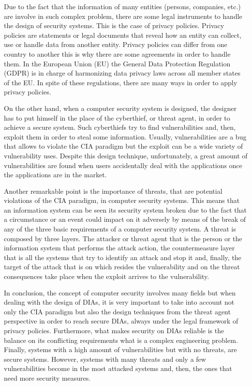 Due to the fact that the information of many entities (persons, companies, etc.) are involve in such complex problem, there are some legal instruments to handle the design of security systems. This is the case of privacy policies. Privacy policies are statements or legal documents that reveal how an entity can collect, use or handle data from another entity. Privacy policies can differ from one country to another this is why there are some agreements in order to handle them. In the European Union (EU) the General Data Protection Regulation (GDPR) is in charge of harmonizing data privacy laws across all member states of the EU. In spite of these regulations, there are many ways in order to apply privacy policies.

On the other hand, when a computer security system is designed, the designer has to put himself in the place of the cyberthief, or threat agent, in order to achieve a secure system. Such cyberthiefs try to find vulnerabilities and, then, exploit them in order to steal some information. Usually, vulnerabilities are a bug that allows to violate the CIA paradigm but the exploit can be a wide variety of vulnerability uses. Despite this design technique, unfortunately, a great amount of vulnerabilities are found when users accidentally deal with the applications once the applications are in the market.

Another remarkable point is the importance of threats, that are potential violations of the CIA paradigm, in computer security systems. This means that an information system can be seen its security system broken due to the fact that a circumstance or an event could impact on it adversely by means of the break of any of the three basic requirements of a computer security system. A threat is composed by three layers. The attacker or threat agent that is the person or the information system that performs the attack action, the countermeasure layer that is all the systems that try to identify an attack and stop it and, finally, the target of the attack that is on which resides the vulnerability and on the threat consequences take place when the exploit arrives to the vulnerability.

In conclusion, the concept of computer security involves many fields but when dealing with the design of DIAs, it is very important to take into account not only the CIA paradigm but also the design techniques from the threat agent perspective in order to reach secure DIAs, always under the legal framework of privacy policies. Furthermore, what makes security on DIAs reliable is the balance on its conflicting requirements what is a complex engineering problem. Finally, systems with a high amount of vulnerabilities but with no threats, are secure systems. However, systems with many threats and only a few vulnerabilities become in the most attacked systems and, then, the ones that need more security measures.

